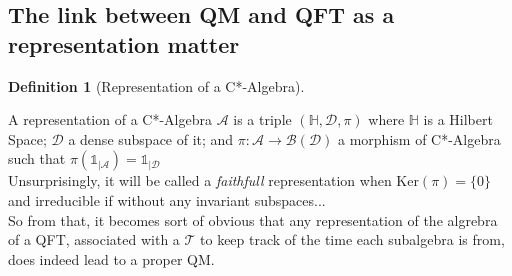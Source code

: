 \documentclass[a4paper,11pt]{article}
\numberwithin{equation}{section}
\theoremstyle{definition}
\newtheorem{definition}{Definition}
\newtheorem{comment}{Comment}
\begin{document}
\subsection{The link between QM and QFT as a representation matter}

\begin{definition}[Representation of a C*-Algebra]$\quad$

    A representation of a C*-Algebra $\mathcal{A}$ is a triple $(\mathbb{H},\mathcal{D},\pi)$ where $\mathbb{H}$ is a Hilbert Space; $\mathcal{D}$ a dense subspace of it; and $\pi : \mathcal{A}\to\mathcal{B}(\mathcal{D})$ a morphism of C*-Algebra such that $\pi(\mathds{1}_{|\mathcal{A}})=\mathds{1}_{|\mathcal{D}}$\\
    Unsurprisingly, it will be called a \emph{faithfull} representation when $\mathrm{Ker}(\pi)=\{0\}$ and irreducible if without any invariant subspaces...
    \\ So from that, it becomes sort of obvious that any representation of the algrebra of a QFT, associated with a $\mathcal{T}$ to keep track of the time each subalgebra is from, does indeed lead to a proper QM.
\end{definition}
\end{document}
